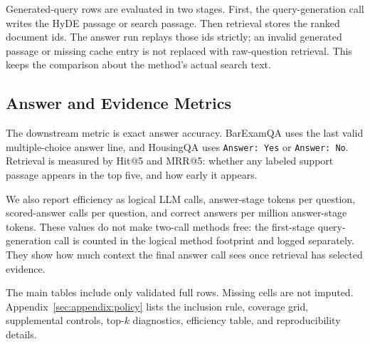 Generated-query rows are evaluated in two stages. First, the query-generation
call writes the HyDE passage or \hyre{} search passage. Then retrieval stores
the ranked document ids. The answer run replays those ids strictly; an invalid
generated passage or missing cache entry is not replaced with raw-question
retrieval. This keeps the comparison about the method's actual search text.

\subsection{Answer and Evidence Metrics}

The downstream metric is exact answer accuracy. BarExamQA uses the last valid
multiple-choice answer line, and HousingQA uses \texttt{Answer: Yes} or
\texttt{Answer: No}. Retrieval is measured by Hit@5 and MRR@5: whether any
labeled support passage appears in the top five, and how early it appears.

We also report efficiency as logical LLM calls, answer-stage tokens per
question, scored-answer calls per question, and correct answers per million
answer-stage tokens. These values do not make two-call methods free: the
first-stage query-generation call is counted in the logical method footprint
and logged separately. They show how much context the final answer call sees
once retrieval has selected evidence.

The main tables include only validated full rows. Missing cells are not
imputed. Appendix~\ref{sec:appendix:policy} lists the inclusion rule, coverage
grid, supplemental controls, top-$k$ diagnostics, efficiency table, and
reproducibility details.
